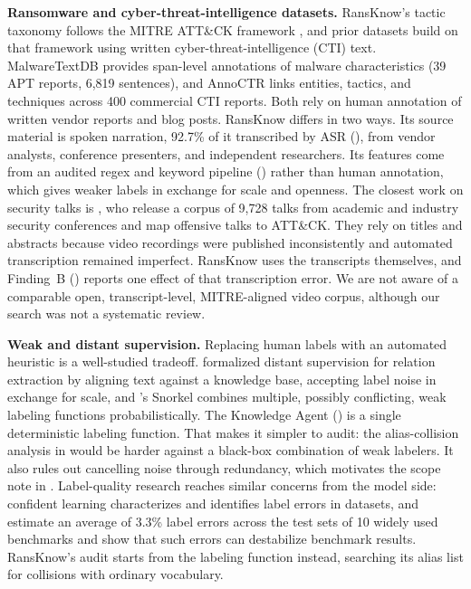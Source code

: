 \documentclass[preprint,12pt]{elsarticle}
\begin{document}
\textbf{Ransomware and cyber-threat-intelligence datasets.} RansKnow's
tactic taxonomy follows the MITRE ATT\&CK framework
\citep{strom2018attack}, and prior datasets build on that framework using
written cyber-threat-intelligence (CTI) text. MalwareTextDB
\citep{lim2017malwaretextdb} provides span-level annotations of malware
characteristics (39 APT reports, 6{,}819 sentences), and AnnoCTR
\citep{lange2024annoctr} links entities, tactics, and techniques across
400 commercial CTI reports. Both rely on human annotation of written vendor
reports and blog posts. RansKnow differs in two ways. Its source material
is spoken narration, 92.7\% of it transcribed by ASR
(), from vendor analysts, conference presenters, and
independent researchers. Its features come from an audited regex and
keyword pipeline () rather than human annotation, which
gives weaker labels in exchange for scale and openness. The closest work on
security talks is \citet{walter2026whoshares}, who release a corpus
of 9{,}728 talks from academic and industry security conferences and map
offensive talks to ATT\&CK. They rely on titles and abstracts because video
recordings were published inconsistently and automated transcription remained
imperfect. RansKnow uses the transcripts themselves, and Finding~B
() reports one effect of that transcription error. We are
not aware of a comparable open, transcript-level, MITRE-aligned video corpus, although
our search was not a systematic review.

\textbf{Weak and distant supervision.} Replacing human labels with an
automated heuristic is a well-studied tradeoff.
\citet{mintz2009distant} formalized distant supervision for relation
extraction by aligning text against a knowledge base, accepting label noise
in exchange for scale, and \citet{ratner2017snorkel}'s Snorkel combines
multiple, possibly conflicting, weak labeling functions probabilistically.
The Knowledge Agent () is a single deterministic labeling
function. That makes it simpler to audit: the alias-collision analysis in
 would be harder against a black-box combination of
weak labelers. It also rules out cancelling noise through redundancy, which
motivates the scope note in . Label-quality research reaches similar concerns from
the model side: confident learning \citep{northcutt2021confident}
characterizes and identifies label errors in datasets, and
\citet{northcutt2021pervasive} estimate an average of 3.3\% label errors
across the test sets of 10 widely used benchmarks and show that such
errors can destabilize benchmark results. RansKnow's audit starts from
the labeling function instead, searching its alias list for collisions
with ordinary vocabulary.
\end{document}
